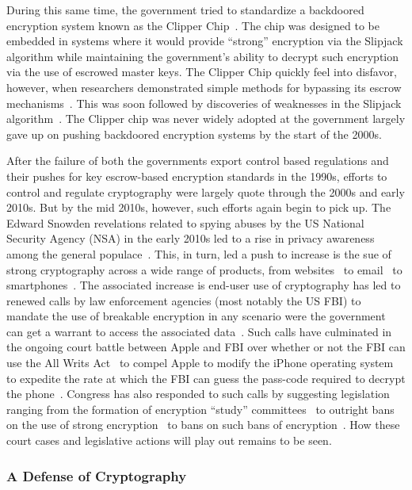 During this same time, the government tried to standardize a
backdoored encryption system known as the Clipper
Chip~\cite{whitehouse-clipper}. The chip was designed to be embedded
in systems where it would provide ``strong'' encryption via the
Slipjack algorithm while maintaining the government's ability to
decrypt such encryption via the use of escrowed master keys. The
Clipper Chip quickly feel into disfavor, however, when researchers
demonstrated simple methods for bypassing its escrow
mechanisms~\cite{blaze1994}. This was soon followed by discoveries of
weaknesses in the Slipjack algorithm~\cite{biham1998}. The Clipper
chip was never widely adopted at the government largely gave up on
pushing backdoored encryption systems by the start of the 2000s.

After the failure of both the governments export control based
regulations and their pushes for key escrow-based encryption standards
in the 1990s, efforts to control and regulate cryptography were
largely quote through the 2000s and early 2010s. But by the mid 2010s,
however, such efforts again begin to pick up. The Edward Snowden
revelations related to spying abuses by the US National Security
Agency (NSA) in the early 2010s led to a rise in privacy awareness
among the general populace~\cite{pew-privsec14}. This, in turn, led a
push to increase is the sue of strong cryptography across a wide range
of products, from websites~\cite{mozilla-deprecatehttp} to
email~\cite{gmail-blog-encryption} to
smartphones~\cite{ars-ios-encrypt, ars-android-encrypt}. The
associated increase is end-user use of cryptography has led to renewed
calls by law enforcement agencies (most notably the US FBI) to mandate
the use of breakable encryption in any scenario were the government
can get a warrant to access the associated
data~\cite{comey-testimony-encryption}. Such calls have culminated in
the ongoing court battle between Apple and FBI over whether or not the
FBI can use the All Writs Act~\cite{usc-allwrits} to compel Apple to
modify the iPhone operating system to expedite the rate at which the
FBI can guess the pass-code required to decrypt the
phone~\cite{ars-cookvfbi}. Congress has also responded to such calls
by suggesting legislation ranging from the formation of encryption
``study'' committees~\cite{hr4651} to outright bans on the use of
strong encryption~\cite{bennett-burrbill} to bans on such bans of
encryption~\cite{hr4528}. How these court cases and legislative
actions will play out remains to be seen.

\subsubsection{A Defense of Cryptography}

